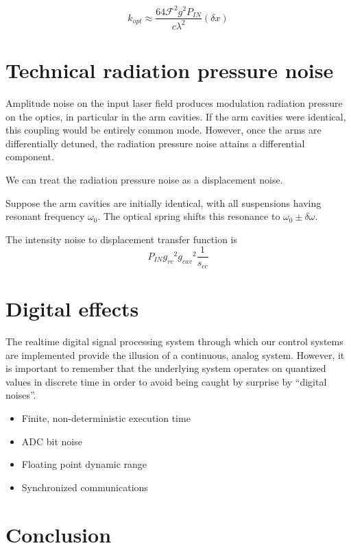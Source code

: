 \begin{equation}
k_{opt}\approx\frac{64\mathcal{F}^{2}g^{2}P_{IN}}{c\lambda^{2}}\left(\delta x\right) 
\end{equation}

\section{Technical radiation pressure noise}

Amplitude noise on the input laser field produces modulation radiation
pressure on the optics, in particular in the arm cavities.  If the arm
cavities were identical, this coupling would be entirely common mode.
However, once the arms are differentially detuned, the radiation
pressure noise attains a differential component.

We can treat the radiation pressure noise as a displacement noise.

Suppose the arm cavities are initially identical, with all 
suspensions having resonant frequency $\omega_0$.  The optical spring
shifts this resonance to $\omega_0 \pm \delta\omega$.

The intensity noise to displacement transfer function is
\begin{equation}
  P_{IN} {g_{rc}}^2 {g_{cav}}^2 \frac{1}{s_{cc}} 
\end{equation}

\section{Digital effects}

The realtime digital signal processing system through which our
control systems are implemented provide the illusion of a continuous,
analog system.  However, it is important to remember that the
underlying system operates on quantized values in discrete time in
order to avoid being caught by surprise by ``digital noises''.

\begin{itemize}
\item Finite, non-deterministic execution time
\item ADC bit noise
\item Floating point dynamic range
\item Synchronized communications
\end{itemize}

\section{Conclusion}
\cite{Smith2008Measurement,Smith2005Oscillator}
